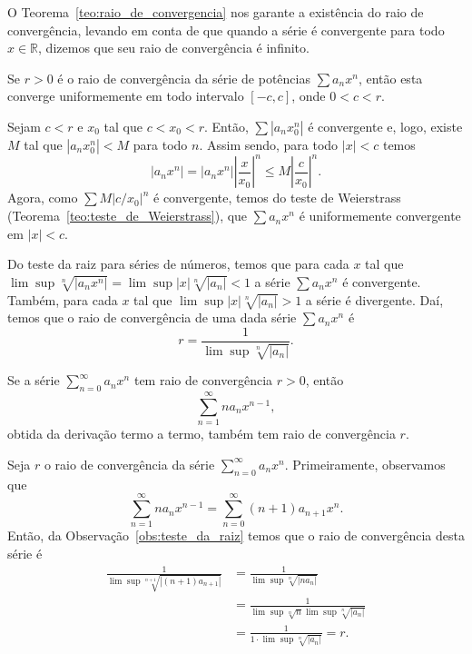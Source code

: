 \begin{obs}
  O Teorema~\ref{teo:raio_de_convergencia} nos garante a existência do raio de convergência, levando em conta de que quando a série é convergente para todo $x\in\mathbb{R}$, dizemos que seu raio de convergência é infinito.
\end{obs}

\begin{teo}
  Se $r>0$ é o raio de convergência da série de potências $\sum a_nx^n$, então esta converge uniformemente em todo intervalo $[-c, c]$, onde $0<c<r$.
\end{teo}
\begin{dem}
  Sejam $c<r$ e $x_0$ tal que $c<x_0<r$. Então, $\sum |a_nx_0^n|$ é convergente e, logo, existe $M$ tal que $|a_nx_0^n|<M$ para todo $n$. Assim sendo, para todo $|x| < c$ temos
  \begin{equation}
    |a_nx^n| = |a_nx^n|\left|\frac{x}{x_0}\right|^n \leq M\left|\frac{c}{x_0}\right|^n.
  \end{equation}
Agora, como $\sum M|c/x_0|^n$ é convergente, temos do teste de Weierstrass (Teorema~\ref{teo:teste_de_Weierstrass}), que $\sum a_nx^n$ é uniformemente convergente em $|x|< c$.
\end{dem}

\begin{obs}\label{obs:teste_da_raiz}
  Do teste da raiz para séries de números, temos que para cada $x$ tal que $\lim\sup \sqrt[n]{|a_nx^n|} = \lim\sup |x|\sqrt[n]{|a_n|}<1$ a série $\sum a_nx^n$ é convergente. Também, para cada $x$ tal que $\lim\sup |x|\sqrt[n]{|a_n|}>1$ a série é divergente. Daí, temos que o raio de convergência de uma dada série $\sum a_nx^n$ é
  \begin{equation}
    r = \frac{1}{\lim\sup \sqrt[n]{|a_n|}}.
  \end{equation}
\end{obs}

\begin{teo}\label{teo:ser_pot_deriv}
  Se a série $\sum_{n=0}^\infty a_nx^n$ tem raio de convergência $r>0$, então 
  \begin{equation}
    \sum_{n=1}^\infty na_nx^{n-1},
  \end{equation}
obtida da derivação termo a termo, também tem raio de convergência $r$.
\end{teo}
\begin{dem}
  Seja $r$ o raio de convergência da série $\sum_{n=0}^\infty a_nx^n$. Primeiramente, observamos que
  \begin{equation}
    \sum_{n=1}^\infty na_nx^{n-1} = \sum_{n=0}^\infty (n+1)a_{n+1}x^n.
  \end{equation}
Então, da Observação~\ref{obs:teste_da_raiz} temos que o raio de convergência desta série é
\begin{align}
  \frac{1}{\lim\sup \sqrt[n+1]{|(n+1)a_{n+1}|}} &= \frac{1}{\lim\sup \sqrt[n]{|na_{n}|}} \\
  &= \frac{1}{\lim\sup \sqrt[n]{n} \lim\sup \sqrt[n]{|a_{n}|}}\\
  &= \frac{1}{1 \cdot \lim\sup \sqrt[n]{|a_{n}|}} = r.
\end{align}
\end{dem}

